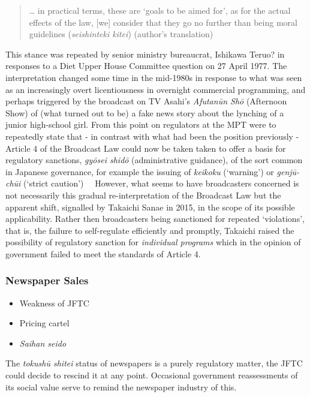 \documentclass[11pt, headings=normal]{scrartcl}
\begin{document}
\begin{quote}
\ldots{} in practical terms, these are `goals to be aimed for', as for
the actual effects of the law, {[}we{]} consider that they go no further
than being moral guidelines (\emph{seishinteki kitei}) (author's
translation)
\end{quote}

This stance was repeated by senior ministry bureaucrat, Ishikawa Teruo?
in responses to a Diet Upper House Committee question on 27 April 1977.
The interpretation changed some time in the mid-1980s in response to
what was seen as an increasingly overt licentiousness in overnight
commercial programming, and perhaps triggered by the broadcast on TV
Asahi's \emph{Afutanūn Shō} (Afternoon Show) of (what turned out to be)
a fake news story about the lynching of a junior high-school girl. From
this point on regulators at the MPT were to repeatedly state that - in
contrast with what had been the position previously - Article 4 of the
Broadcast Law could now be taken taken to offer a basis for regulatory
sanctions, \emph{gyōsei shidō} (administrative guidance), of the sort
common in Japanese governance, for example the issuing of \emph{keikoku}
(`warning') or \emph{genjū-chūi} (`strict
caution')　\autocite[57]{Hara:2017} However, what seems to have
broadcasters concerned is not necessarily this gradual re-interpretation
of the Broadcast Law but the apparent shift, signalled by Takaichi Sanae
in 2015, in the scope of its possible applicability. Rather then
broadcasters being sanctioned for repeated `violations', that is, the
failure to self-regulate efficiently and promptly, Takaichi raised the
possibility of regulatory sanction for \emph{individual programs} which
in the opinion of government failed to meet the standards of Article 4.
\autocite[57]{Hara:2017}

\hypertarget{newspaper-sales}{%
\subsubsection*{Newspaper Sales}\label{newspaper-sales}}

\begin{itemize}
\tightlist
\item
  Weakness of JFTC
\item
  Pricing cartel
\item
  \emph{Saihan seido}
\end{itemize}

The \emph{tokushū shitei} status of newspapers is a purely regulatory
matter, the JFTC could decide to rescind it at any point. Occasional
government reassessments of its social value serve to remind the
newspaper industry of this.
\end{document}
